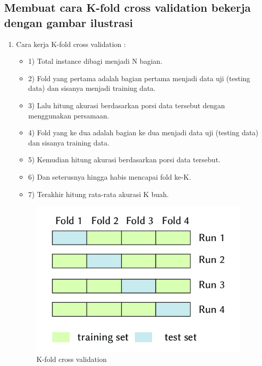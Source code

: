 \subsection{Membuat cara K-fold cross validation bekerja dengan gambar ilustrasi}
\begin{enumerate}
\item Cara kerja K-fold cross validation :
\begin{itemize}
\item 1)	Total instance dibagi menjadi N bagian.
\item 2)	Fold yang pertama adalah bagian pertama menjadi data uji (testing data) dan sisanya menjadi training data.
\item 3)	Lalu hitung akurasi berdasarkan porsi data tersebut dengan menggunakan persamaan.
\item 4)	Fold yang ke dua adalah bagian ke dua menjadi data uji (testing data) dan sisanya training data. 
\item 5)	Kemudian hitung akurasi berdasarkan porsi data tersebut.
\item 6)	Dan seterusnya hingga habis mencapai fold ke-K.
\item 7)	Terakhir hitung rata-rata akurasi K buah.
\end{itemize}
\begin{figure}[ht]
\centering
\includegraphics[scale=0.5]{figures/6mrdt.png}
\caption{K-fold cross validation}
\label{contoh}
\end{figure}
\end{enumerate}

